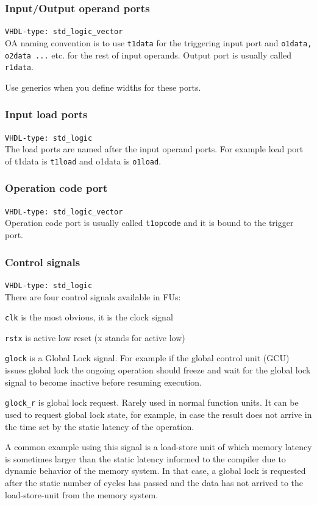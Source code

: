 \documentclass[a4paper,twoside]{tceusermanual}
\begin{document}
\subsubsection{Input/Output operand ports}
\verb|VHDL-type: std_logic_vector| \\
OA naming convention is to use \verb|t1data| for the triggering input port
and \verb|o1data, o2data ...| etc. for the rest of input operands. Output port
is usually called \verb|r1data|.

Use generics when you define widths for these ports.

\subsubsection{Input load ports}
\verb|VHDL-type: std_logic| \\
The load ports are named after the input operand ports. For example load port
of t1data is \verb|t1load| and o1data is \verb|o1load|.

\subsubsection{Operation code port}
\verb|VHDL-type: std_logic_vector| \\
Operation code port is usually called \verb|t1opcode| and it is bound to the
trigger port.

\subsubsection{Control signals}
\verb|VHDL-type: std_logic| \\
There are four control signals available in FUs:

\verb|clk| is the most obvious, it is the clock signal

\verb|rstx| is active low reset (x stands for active low)

\verb|glock| is a Global Lock signal. For example if the global control unit
(GCU) issues global lock the ongoing operation should freeze and wait for
the global lock signal to become inactive before resuming execution.

\verb|glock_r| is global lock request. Rarely used in normal function units.
It can be used to request global lock state, for example, in case the
result does not arrive in the time set by the static latency of the
operation. 

A common example using this signal is a load-store unit of which
memory latency is sometimes larger than the static latency informed to the
compiler due to dynamic behavior of the memory system. In that case, a
global lock is requested after the static number of cycles has passed and
the data has not arrived to the load-store-unit from the memory system.
\end{document}
